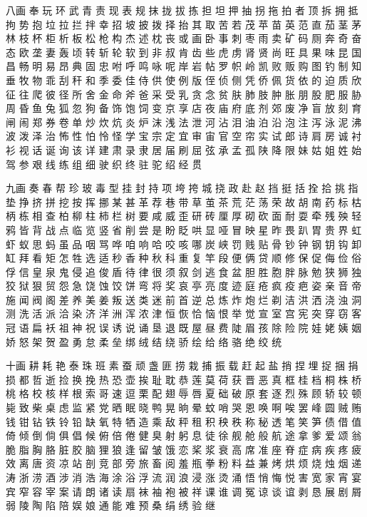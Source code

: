 {		八画
		奉 玩 环 武 青 责 现 表 规 抹 拢 拔 拣 担 坦 押 抽 拐 拖 拍 者 顶 拆
		拥 抵 拘 势 抱 垃 拉 拦 拌
		幸 招 坡 披 拨 择 抬 其 取 苦 若 茂 苹 苗 英 范 直 茄 茎 茅 林 枝 杯
		柜 析 板 松 枪 构 杰 述 枕
		丧 或 画 卧 事 刺 枣 雨 卖 矿 码 厕 奔 奇 奋 态 欧 垄 妻 轰 顷 转 斩
		轮 软 到 非 叔 肯 齿 些 虎
		虏 肾 贤 尚 旺 具 果 味 昆 国 昌 畅 明 易 昂 典 固 忠 咐 呼 鸣 咏 呢
		岸 岩 帖 罗 帜 岭 凯 败 贩
		购 图 钓 制 知 垂 牧 物 乖 刮 秆 和 季 委 佳 侍 供 使 例 版 侄 侦 侧
		凭 侨 佩 货 依 的 迫 质 欣
		征 往 爬 彼 径 所 舍 金 命 斧 爸 采 受 乳 贪 念 贫 肤 肺 肢 肿 胀 朋
		股 肥 服 胁 周 昏 鱼 兔 狐
		忽 狗 备 饰 饱 饲 变 京 享 店 夜 庙 府 底 剂 郊 废 净 盲 放 刻 育 闸
		闹 郑 券 卷 单 炒 炊 炕 炎
		炉 沫 浅 法 泄 河 沾 泪 油 泊 沿 泡 注 泻 泳 泥 沸 波 泼 泽 治 怖 性
		怕 怜 怪 学 宝 宗 定 宜 审
		宙 官 空 帘 实 试 郎 诗 肩 房 诚 衬 衫 视 话 诞 询 该 详 建 肃 录 隶
		居 届 刷 屈 弦 承 孟 孤 陕
		降 限 妹 姑 姐 姓 始 驾 参 艰 线 练 组 细 驶 织 终 驻 驼 绍 经 贯
		
		九画
		奏 春 帮 珍 玻 毒 型 挂 封 持 项 垮 挎 城 挠 政 赴 赵 挡 挺 括 拴 拾
		挑 指 垫 挣 挤 拼 挖 按 挥
		挪 某 甚 革 荐 巷 带 草 茧 茶 荒 茫 荡 荣 故 胡 南 药 标 枯 柄 栋 相
		查 柏 柳 柱 柿 栏 树 要 咸
		威 歪 研 砖 厘 厚 砌 砍 面 耐 耍 牵 残 殃 轻 鸦 皆 背 战 点 临 览 竖
		省 削 尝 是 盼 眨 哄 显 哑
		冒 映 星 昨 畏 趴 胃 贵 界 虹 虾 蚁 思 蚂 虽 品 咽 骂 哗 咱 响 哈 咬
		咳 哪 炭 峡 罚 贱 贴 骨 钞
		钟 钢 钥 钩 卸 缸 拜 看 矩 怎 牲 选 适 秒 香 种 秋 科 重 复 竿 段 便
		俩 贷 顺 修 保 促 侮 俭 俗
		俘 信 皇 泉 鬼 侵 追 俊 盾 待 律 很 须 叙 剑 逃 食 盆 胆 胜 胞 胖 脉
		勉 狭 狮 独 狡 狱 狠 贸 怨
		急 饶 蚀 饺 饼 弯 将 奖 哀 亭 亮 度 迹 庭 疮 疯 疫 疤 姿 亲 音 帝 施
		闻 阀 阁 差 养 美 姜 叛 送
		类 迷 前 首 逆 总 炼 炸 炮 烂 剃 洁 洪 洒 浇 浊 洞 测 洗 活 派 洽 染
		济 洋 洲 浑 浓 津 恒 恢 恰
		恼 恨 举 觉 宣 室 宫 宪 突 穿 窃 客 冠 语 扁 袄 祖 神 祝 误 诱 说 诵
		垦 退 既 屋 昼 费 陡 眉 孩
		除 险 院 娃 姥 姨 姻 娇 怒 架 贺 盈 勇 怠 柔 垒 绑 绒 结 绕 骄 绘 给
		络 骆 绝 绞 统
		
		十画
		耕 耗 艳 泰 珠 班 素 蚕 顽 盏 匪 捞 栽 捕 振 载 赶 起 盐 捎 捏 埋 捉
		捆 捐 损 都 哲 逝 捡 换 挽
		热 恐 壶 挨 耻 耽 恭 莲 莫 荷 获 晋 恶 真 框 桂 档 桐 株 桥 桃 格 校
		核 样 根 索 哥 速 逗 栗 配
		翅 辱 唇 夏 础 破 原 套 逐 烈 殊 顾 轿 较 顿 毙 致 柴 桌 虑 监 紧 党
		晒 眠 晓 鸭 晃 晌 晕 蚊 哨
		哭 恩 唤 啊 唉 罢 峰 圆 贼 贿 钱 钳 钻 铁 铃 铅 缺 氧 特 牺 造 乘 敌
		秤 租 积 秧 秩 称 秘 透 笔
		笑 笋 债 借 值 倚 倾 倒 倘 俱 倡 候 俯 倍 倦 健 臭 射 躬 息 徒 徐 舰
		舱 般 航 途 拿 爹 爱 颂 翁
		脆 脂 胸 胳 脏 胶 脑 狸 狼 逢 留 皱 饿 恋 桨 浆 衰 高 席 准 座 脊 症
		病 疾 疼 疲 效 离 唐 资 凉
		站 剖 竞 部 旁 旅 畜 阅 羞 瓶 拳 粉 料 益 兼 烤 烘 烦 烧 烛 烟 递 涛
		浙 涝 酒 涉 消 浩 海 涂 浴
		浮 流 润 浪 浸 涨 烫 涌 悟 悄 悔 悦 害 宽 家 宵 宴 宾 窄 容 宰 案 请
		朗 诸 读 扇 袜 袖 袍 被 祥
		课 谁 调 冤 谅 谈 谊 剥 恳 展 剧 屑 弱 陵 陶 陷 陪 娱 娘 通 能 难 预
		桑 绢 绣 验 继
		
}
